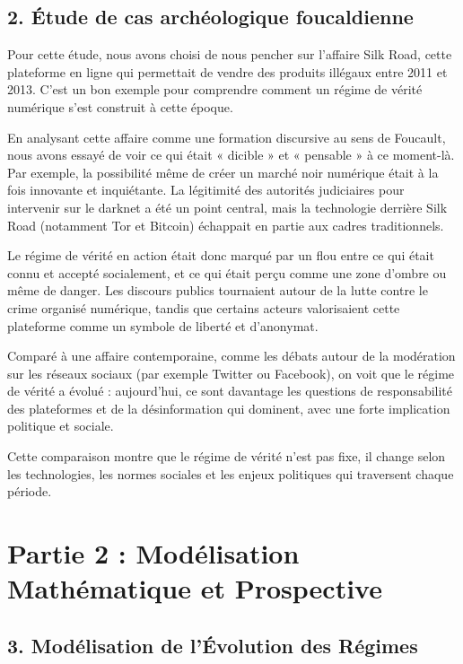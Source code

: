 \documentclass[12pt,a4paper]{report}
\begin{document}
\subsection*{2. Étude de cas archéologique foucaldienne}

Pour cette étude, nous avons choisi de nous pencher sur l’affaire Silk Road, cette plateforme en ligne qui permettait de vendre des produits illégaux entre 2011 et 2013. C’est un bon exemple pour comprendre comment un régime de vérité numérique s’est construit à cette époque.

En analysant cette affaire comme une formation discursive au sens de Foucault, nous avons essayé de voir ce qui était « dicible » et « pensable » à ce moment-là. Par exemple, la possibilité même de créer un marché noir numérique était à la fois innovante et inquiétante. La légitimité des autorités judiciaires pour intervenir sur le darknet a été un point central, mais la technologie derrière Silk Road (notamment Tor et Bitcoin) échappait en partie aux cadres traditionnels.

Le régime de vérité en action était donc marqué par un flou entre ce qui était connu et accepté socialement, et ce qui était perçu comme une zone d’ombre ou même de danger. Les discours publics tournaient autour de la lutte contre le crime organisé numérique, tandis que certains acteurs valorisaient cette plateforme comme un symbole de liberté et d’anonymat.

Comparé à une affaire contemporaine, comme les débats autour de la modération sur les réseaux sociaux (par exemple Twitter ou Facebook), on voit que le régime de vérité a évolué : aujourd’hui, ce sont davantage les questions de responsabilité des plateformes et de la désinformation qui dominent, avec une forte implication politique et sociale.

Cette comparaison montre que le régime de vérité n’est pas fixe, il change selon les technologies, les normes sociales et les enjeux politiques qui traversent chaque période.

\section*{Partie 2 : Modélisation Mathématique et Prospective}

\subsection*{3. Modélisation de l’Évolution des Régimes}
\end{document}

